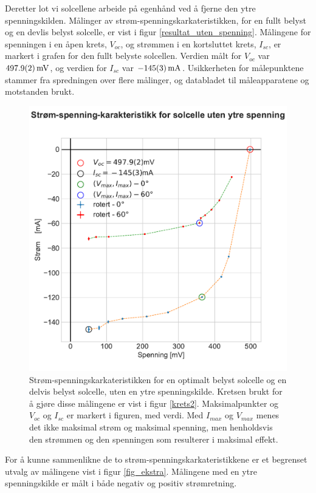 \documentclass[%
 reprint,
 amsmath,amssymb,
 aps,
 norsk,
 booktabs
]{revtex4-1}
\begin{document}
Deretter lot vi solcellene arbeide på egenhånd ved å fjerne den ytre spenningskilden. Målinger av strøm-spenningskarkateristikken, for en fullt belyst og en devlis belyst solcelle, er vist i figur \vref{resultat_uten_spenning}. Målingene for spenningen i en åpen krets, $V_{oc}$, og strømmen i en kortsluttet krets, $I_{sc}$, er markert i grafen for den fullt belyste solcellen. Verdien målt for $V_{oc}$ var $\SI{497.9\pm0.2}{\milli\volt}$, og verdien for $I_{sc}$ var $\SI{-145\pm3}{\milli\ampere}$. Usikkerheten for målepunktene stammer fra spredningen over flere målinger, og databladet til måleapparatene og motstanden brukt. \\
\begin{figure}
  \centering
  \includegraphics[scale=0.45]{strom_spenning_karr_test.pdf}
  \caption{Strøm-spenningskarkateristikken for en optimalt belyst solcelle og en delvis belyst solcelle, uten en ytre spenningskilde. Kretsen brukt for å gjøre disse målingene er vist i figur \vref{krets2}. Maksimalpunkter og $V_{oc}$ og $I_{sc}$ er markert i figuren, med verdi. Med $I_{max}$ og $V_{max}$ menes det ikke maksimal strøm og maksimal spenning, men henholdsvis den strømmen og den spenningen som resulterer i maksimal effekt.}
  \label{resultat_uten_spenning}
\end{figure}
For å kunne sammenlikne de to strøm-spenningskarkateristikkene er et begrenset utvalg av målingene vist i figur \vref{fig_ekstra}. Målingene med en ytre spenningskilde er målt i både negativ og positiv strømretning.
\end{document}
